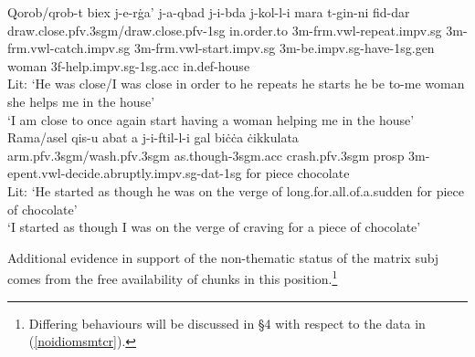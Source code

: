 \documentclass[output=paper]{LSP/langsci}
\begin{document}
\ea \label{3sgmchainraising}
\ea
\gll Qorob/qrob-t biex j-e-r{\.g}a' j-a-qbad j-i-bda j-kol-l-i mara t-g\textcrh in-ni fid-dar\\
draw.close.{\sc pfv.3sgm}/draw.close.{\sc pfv-1sg} in.order.to 3{\sc m}-{\sc frm.vwl}-repeat.{\sc impv.sg} 3{\sc m}-{\sc frm.vwl}-catch.{\sc impv.sg} 3{\sc m}-{\sc frm.vwl}-start.{\sc impv.sg} 3{\sc m}-be.{\sc impv.sg}-have-{\sc 1sg.gen} woman 3{\sc f}-help.{\sc impv.sg-1sg.acc} in.{\sc def-}house\\
\glt Lit: `He was close/I was close in order to he repeats he starts he be to-me woman she helps me in the house'\\
\glt `I am close to once again start having a woman helping me in the house' \hfill{\citep[294]{Camilleri16}}
\ex
\gll Rama/\textcrh asel qis-u \textcrh abat \textcrh a j-i-ftil-l-i g\textcrh al bi{\.c}{\.c}a {\.c}ikkulata\\
arm.{\sc pfv.3sgm}/wash.{\sc pfv.3sgm} as.though-{\sc 3sgm.acc} crash.{\sc pfv.3sgm} {\sc prosp} 3{\sc m}-{\sc epent.vwl}-decide.abruptly.{\sc impv.sg-dat-1sg} for piece chocolate\\
\glt Lit: `He started as though he was on the verge of long.for.all.of.a.sudden for piece of chocolate'\\
\glt `I started as though I was on the verge of craving for a piece of chocolate' \hfill{\citep[294]{Camilleri16}}
\z
\z

Additional evidence in support of the non-thematic status of the matrix {\sc subj} comes from the free availability of  chunks in this position.\footnote{Differing behaviours will be discussed in \S4 with respect to the data in (\ref{noidiomsmtcr}).} %
\end{document}
